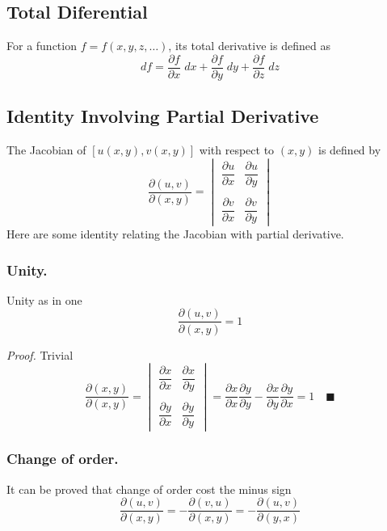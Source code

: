 \documentclass[../../Main.tex]{subfiles}
\begin{document}
\subsection*{Total Diferential}
For a function $f=f(x,y,z,\dots)$, its total derivative is defined as 
\begin{equation*}
    df=\frac{\partial f}{\partial x}\;dx + \frac{\partial f}{\partial y}\;dy  + \frac{\partial f}{\partial z}\;dz 
\end{equation*}
\subsection*{Identity Involving Partial Derivative}
The Jacobian of $[u(x,y), v(x,y)]$ with respect to $(x, y)$ is defined by
\begin{equation*}
    \frac{\partial (u,v)}{\partial (x,y)}=\begin{vmatrix}
       \dfrac{\partial u}{\partial x} & \dfrac{\partial u}{\partial y}\\
       \\
       \dfrac{\partial v}{\partial x} & \dfrac{\partial v}{\partial y}
    \end{vmatrix}    
\end{equation*}
Here are some identity relating the Jacobian with partial derivative.

\subsubsection*{Unity.} Unity as in one
\begin{equation*}
    \frac{\partial (u,v)}{\partial (x,y)}=1
\end{equation*}

\emph{Proof.} Trivial
\begin{equation*}
    \frac{\partial (x,y)}{\partial (x,y)}=\begin{vmatrix}
        \dfrac{\partial x}{\partial x} & \dfrac{\partial x}{\partial y}\\
        \\
        \dfrac{\partial y}{\partial x} & \dfrac{\partial y}{\partial y}
     \end{vmatrix}=\dfrac{\partial x}{\partial x} \dfrac{\partial y}{\partial y}-   \dfrac{\partial x}{\partial y}\dfrac{\partial y}{\partial x}  =1\quad\blacksquare
\end{equation*}

\subsubsection*{Change of order.} It can be proved that change of order cost the minus sign 
\begin{equation*}
    \frac{\partial (u,v)}{\partial (x,y)}=- \frac{\partial (v,u)}{\partial (x,y)}= -\frac{\partial (u,v)}{\partial (y,x)}
\end{equation*}
\end{document}
